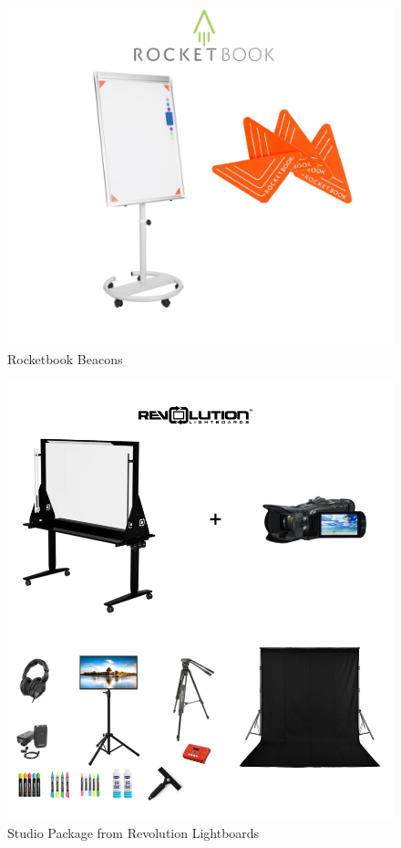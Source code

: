 \documentclass[a4paper]{jpconf}
\begin{document}
\begin{figure}
	\centering
	\includegraphics[width=1\linewidth]{becons.png}
	\caption{Rocketbook Beacons \cite{Rocketbook}}
	\label{fig:ROCK}
\end{figure}

\begin{figure}
	\centering
	\includegraphics[width=1\linewidth]{Revolution.png}
	\caption{ Studio Package from Revolution Lightboards \cite{Revolution}}
	\label{fig:REV}
\end{figure}
\end{document}
